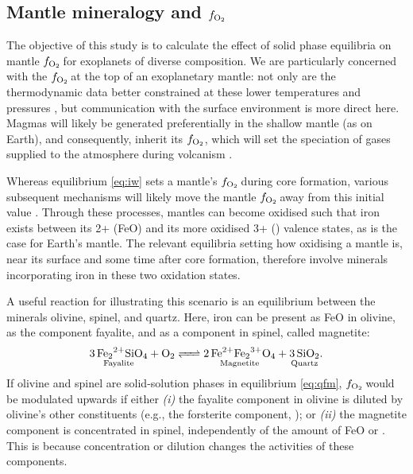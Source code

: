 \documentclass[fleqn,usenatbib,twocolumn]{mnras}
\newcommand{\fo}{$f_{\ce{O2}}$}
\begin{document}
\subsection{Mantle mineralogy and \fo}

The objective of this study is to calculate the effect of solid phase equilibria on mantle \fo\,for exoplanets of diverse composition. We are particularly concerned with the \fo\,at the top of an exoplanetary mantle: not only are the thermodynamic data better constrained at these lower temperatures and pressures \citep[$\lesssim 25\,$GPa;][]{guimond_mantle_2023}, but communication with the surface environment is more direct here. Magmas will likely be generated preferentially in the shallow mantle (as on Earth), and consequently, inherit its \fo, which will set the speciation of gases supplied to the atmosphere during volcanism \citep{gaillard_redox_2015, ortenzi_mantle_2020, liggins_can_2020, guimond_low_2021}. 

Whereas equilibrium \eqref{eq:iw} sets a mantle's \fo\,during core formation, various subsequent mechanisms will likely move the mantle \fo\,away from this initial value \citep[e.g.,][]{frost_experimental_2004, wade_core_2005, wood_accretion_2006, williams_isotopic_2012, rubie_accretion_2015, hirschmann_magma_2022}. Through these processes, mantles can become oxidised such that iron exists between its 2+ (FeO) and its more oxidised 3+ () valence states, as is the case for Earth's mantle. The relevant equilibria setting how oxidising a mantle is, near its surface and some time after core formation, therefore involve minerals incorporating iron in these two oxidation states.

A useful reaction for illustrating this scenario is an equilibrium between the minerals olivine, spinel, and quartz. Here, iron can be present as FeO in olivine, as the component fayalite, and as a  component in spinel, called magnetite:
\begin{equation}\label{eq:qfm}
    \ce{$\underset{\text{Fayalite}}{\ce{3 Fe_2^{2+}SiO4}}$ + O2 <=> $\underset{\text{Magnetite}}{\ce{2 Fe^{2+}Fe2^{3+}O4}}$ + $\underset{\text{Quartz}}{\ce{3 SiO2}}$}.
\end{equation}
If olivine and spinel are solid-solution phases in equilibrium \eqref{eq:qfm}, \fo\,would be modulated upwards if either \textit{(i)} the fayalite component in olivine is diluted by olivine's other constituents (e.g., the forsterite component, ); or \textit{(ii)} the magnetite component is concentrated in spinel, independently of the amount of FeO or . This is because concentration or dilution changes the activities of these components.
\end{document}
